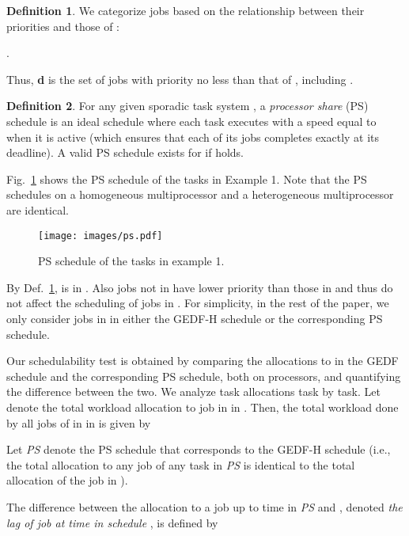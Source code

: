 \documentclass[Times, 10pt,twocolumn]{article}
\theoremstyle{definition}
\newtheorem{definition}{\textbf{Definition}}
\begin{document}
\begin{definition}
\label{def:d}
We categorize jobs based on the relationship between their priorities and those of :
\begin{center}
.
\end{center}
\end{definition}
Thus, \textbf{d} is the set of jobs with priority no less than that of , including .
\begin{definition}
\label{def:PS}
For any given sporadic task system , a \textit{processor share} (PS) schedule is an ideal schedule where each task  executes with a speed equal to  when it is active (which ensures that each of its jobs completes exactly at its deadline). A valid PS schedule exists for  if  holds. 

Fig.~\ref{fig:PSschedule} shows the PS schedule of the tasks in Example 1. Note that the PS schedules on a homogeneous multiprocessor and a heterogeneous multiprocessor are identical.
\end{definition}

\begin{figure}[t]
	\begin{center}
	\texttt{[image: images/ps.pdf]} 
	\end{center} 
\vspace{-5mm}
\caption{\small PS schedule of the tasks in example 1.}
\vspace{-5mm}
\label{fig:PSschedule}
\end{figure}


By Def.~\ref{def:d},  is in . Also jobs not in  have lower priority than those in  and thus do not affect the scheduling of jobs in . For simplicity, in the rest of the paper, we only consider jobs in  in either the GEDF-H schedule  or the corresponding PS schedule.

Our schedulability test is obtained by comparing the allocations to  in the GEDF schedule  and the corresponding PS schedule, both on  processors, and quantifying the difference between the two. We analyze task allocations task by task. Let  denote the total workload allocation to job  in  in . Then, the total workload done by all jobs of  in  in  is given by 



Let \textit{PS} denote the PS schedule that corresponds to the GEDF-H schedule  (i.e., the total allocation to any job of any task in \textit{PS} is identical to the total allocation of the job in ). 

The difference between the allocation to a job  up to time  in \textit{PS} and , denoted \textit{the lag of job  at time  in schedule }, is defined by
\end{document}
